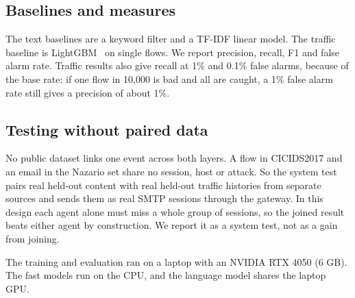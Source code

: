 \subsection{Baselines and measures}

The text baselines are a keyword filter and a TF-IDF linear model. The traffic baseline is LightGBM~\cite{lightgbm} on single flows. We report precision, recall, F1 and false alarm rate. Traffic results also give recall at 1\% and 0.1\% false alarms, because of the base rate: if one flow in 10,000 is bad and all are caught, a 1\% false alarm rate still gives a precision of about 1\%.

\subsection{Testing without paired data}
\label{sec:nopaired}

No public dataset links one event across both layers. A flow in CICIDS2017 and an email in the Nazario set share no session, host or attack. So the system test pairs real held-out content with real held-out traffic histories from separate sources and sends them as real SMTP sessions through the gateway. In this design each agent alone must miss a whole group of sessions, so the joined result beats either agent by construction. We report it as a system test, not as a gain from joining.

The training and evaluation ran on a laptop with an NVIDIA RTX 4050 (6 GB). The fast models run on the CPU, and the language model shares the laptop GPU.

